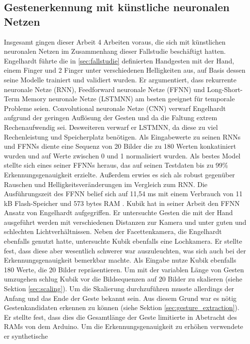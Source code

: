 \subsection{Gestenerkennung mit künstliche neuronalen Netzen}
Insgesamt gingen dieser Arbeit 4 Arbeiten voraus, die sich mit künstlichen neuronalen Netzen im Zusammenhang dieser Fallstudie beschäftigt hatten.
\newline
\newline
Engelhardt führte die in \ref{sec:fallstudie} definierten Handgesten mit der Hand, einem Finger und 2 Finger unter verschiedenen Helligkeiten aus, auf Basis dessen seine Modelle trainiert und validiert wurden. Er
argumentiert, dass rekurrente neuronale Netze (RNN), Feedforward neuronale Netze (FFNN) und Long-Short-Term Memory neuronale Netze (LSTMNN) am besten geeignet für temporale Probleme seien. Convolutional neuronale
Netze (CNN) verwarf Engelhardt aufgrund der geringen Auflösung der Gesten und da die Faltung extrem Rechenaufwendig sei. Desweiteren verwarf er LSTMNN, da diese zu viel Rechenleistung und Speicherplatz
benötigen. Als Eingabewerte zu seinen RNNs und FFNNs diente eine Sequenz von 20 Bilder die zu 180 Werten konkatiniert wurden und auf Werte zwischen 0 und 1 normalisiert wurden. Als bestes Model stellte sich eines
seiner FFNNs heraus, das auf seinen Testdaten bis zu 99\% Erkennungsgenauigkeit erzielte. Außerdem erwies es sich als robust gegenüber Rauschen und Helligkeitsveränderungen im Vergleich zum RNN. Die Ausführungszeit
des FFNN belief sich auf 11,54 ms mit einem Verbrauch von 11 kB Flash-Speicher und 573 bytes RAM \cite{engelhardtThesis}.
\newline
\newline
Kubik hat in seiner Arbeit den FFNN Ansatz von Engelhardt aufgegriffen. Er untersuchte Gesten die mit der Hand ausgeführt werden mit verschiedenen Distanzen zur Kamera und unter guten und schlechten Lichtverhältnissen.
Neben der Facettenkamera, die Engelhardt ebenfalls genutzt hatte, untersuchte Kubik ebenfalls eine Lochkamera. Er stellte fest, dass diese aber wesentlich schwerer war auszuleuchten, was sich auch bei der
Erkennungsgenauigkeit bemerkbar machte. Als Eingabe nutze Kubik ebenfalls 180 Werte, die 20 Bilder repräsentieren. Um mit der variablen Länge von Gesten umzugehen schlug Kubik vor die Bildsequenzen auf 20 Bilder zu
skalieren (siehe Sektion \ref{sec:scaling}). Um die Skalierung durchzuführen musste allerdings der Anfang und das Ende der Geste bekannt sein. Aus diesem Grund war es nötig Gestenkandidaten erkennen zu können (siehe
Sektion \ref{sec:gesture_extraction}). Er stellte fest, dass dies die Gesamtlänge der Geste limitierte in Abetracht des RAMs von dem Arduino. Um die Erkennungsgenauigkeit zu erhöhen verwendete er synthetische
